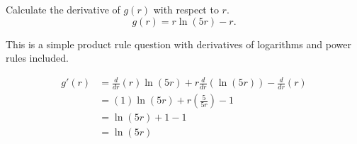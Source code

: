 \documentclass{ximera}
\author{Emma Smith Zbarsky}
\begin{document}
\begin{exercise}

Calculate the derivative of $g(r)$ with respect to $r$.
\[g(r) = r\ln(5r)-r.\]


\begin{hint}
This is a simple product rule question with derivatives of logarithms
and power rules included.
\end{hint}


\begin{hint}
\begin{align*}
g'(r) &= \frac{d}{dr}(r)\ln(5r)+r\frac{d}{dr}\left(\ln(5r)\right) - \frac{d}{dr}\left(r\right) \\
&= (1)\ln(5r) + r\left(\frac{5}{5r}\right) - 1 \\
&= \ln(5r) + 1 -1 \\
&= \ln(5r)
\end{align*}
\end{hint}


\begin{multipleChoice}
\end{multipleChoice}

\end{exercise}
\end{document}
